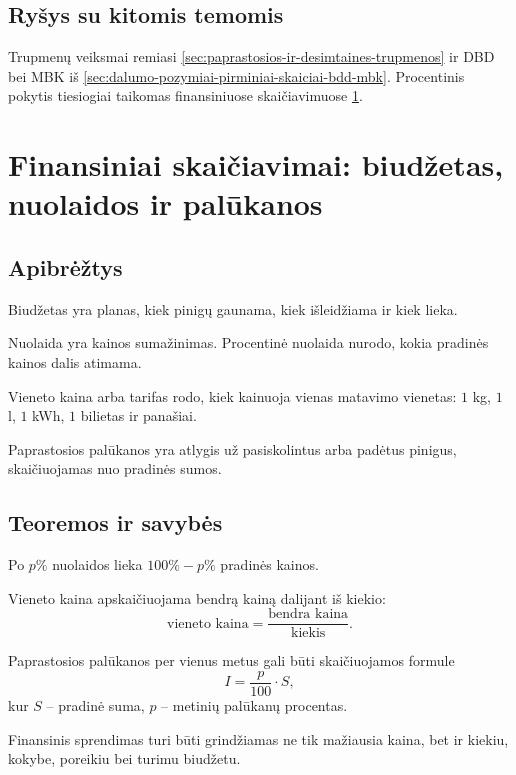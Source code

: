 \subsection{Ryšys su kitomis temomis}
Trupmenų veiksmai remiasi \ref{sec:paprastosios-ir-desimtaines-trupmenos} ir DBD bei MBK iš \ref{sec:dalumo-pozymiai-pirminiai-skaiciai-bdd-mbk}. Procentinis pokytis tiesiogiai taikomas finansiniuose skaičiavimuose \ref{sec:finansai-biudzetas-nuolaidos-ir-palukanos}.

\section{Finansiniai skaičiavimai: biudžetas, nuolaidos ir palūkanos}\label{sec:finansai-biudzetas-nuolaidos-ir-palukanos}

\subsection{Apibrėžtys}
\begin{apibreztis}
Biudžetas yra planas, kiek pinigų gaunama, kiek išleidžiama ir kiek lieka.
\end{apibreztis}
\begin{apibreztis}
Nuolaida yra kainos sumažinimas. Procentinė nuolaida nurodo, kokia pradinės kainos dalis atimama.
\end{apibreztis}
\begin{apibreztis}
Vieneto kaina arba tarifas rodo, kiek kainuoja vienas matavimo vienetas: \(1\) kg, \(1\) l, \(1\) kWh, \(1\) bilietas ir panašiai.
\end{apibreztis}
\begin{apibreztis}
Paprastosios palūkanos yra atlygis už pasiskolintus arba padėtus pinigus, skaičiuojamas nuo pradinės sumos.
\end{apibreztis}

\subsection{Teoremos ir savybės}
\begin{savybe}
Po \(p\%\) nuolaidos lieka \(100\%-p\%\) pradinės kainos.
\end{savybe}
\begin{savybe}
Vieneto kaina apskaičiuojama bendrą kainą dalijant iš kiekio:
\[
\text{vieneto kaina}=\frac{\text{bendra kaina}}{\text{kiekis}}.
\]
\end{savybe}
\begin{savybe}
Paprastosios palūkanos per vienus metus gali būti skaičiuojamos formule
\[
I=\frac{p}{100}\cdot S,
\]
kur \(S\) -- pradinė suma, \(p\) -- metinių palūkanų procentas.
\end{savybe}
\begin{savybe}
Finansinis sprendimas turi būti grindžiamas ne tik mažiausia kaina, bet ir kiekiu, kokybe, poreikiu bei turimu biudžetu.
\end{savybe}

